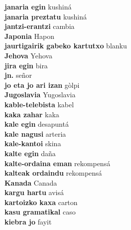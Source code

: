\textbf{ janaria egin  } kushiná \\
\textbf{ janaria preztatu  } kushiná \\
\textbf{ jantzi-erantzi  } cambia \\
\textbf{ Japonia  } Hapon \\
\textbf{ jaurtigairik gabeko kartutxo  } blanku \\
\textbf{ Jehova  } Yehova \\
\textbf{ jira egin  } bira \\
\textbf{ jn.  } señor \\
\textbf{ jo eta jo ari izan  } gòlpi \\
\textbf{ Jugoslavia  } Yugoslavia \\
\textbf{ kable-telebista  } kabel \\
\textbf{ kaka zahar  } kaka \\
\textbf{ kale egin  } desapuntá \\
\textbf{ kale nagusi  } arteria \\
\textbf{ kale-kantoi  } skina \\
\textbf{ kalte egin  } daña \\
\textbf{ kalte-ordaina eman  } rekompensá \\
\textbf{ kalteak ordaindu  } rekompensá \\
\textbf{ Kanada  } Canada \\
\textbf{ kargu hartu  } avisá \\
\textbf{ kartoizko kaxa  } carton \\
\textbf{ kasu gramatikal  } caso \\
\textbf{ kiebra jo  } fayit \\
